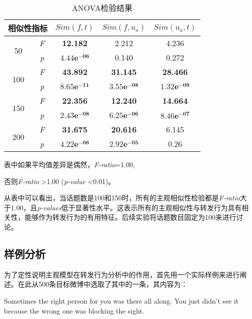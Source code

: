 \begin{table}[htb]
\scriptsize
\centering
\caption{ANOVA检验结果} 
\label{tab6-3}
\begin{tabular}{|c|c|c|c|c|}
\hline
\multicolumn{2}{|c|}{相似性指标}& $ Sim(f,t) $ & $ Sim(f,u_a)  $ & $ Sim(u_a,t)  $\\
\hline
\multirow{2}{*}{50} & \textit{F} & \textbf{12.182} & 2.212 & 4.236 \\
\cline{2-5}
  & \textit{p} &  $\mathbf{4.44e^{-06}}$  & 0.140 & 0.272\\
\hline
\multirow{2}{*}{100} & \textit{F} & \textbf{43.892} & \textbf{31.145} & \textbf{28.466} \\
\cline{2-5}
  & \textit{p} &  $\mathbf{8.65e^{-11}}$  & $\mathbf{3.55e^{-08}}$ & $\mathbf{1.32e^{-09}}$\\
\hline
\multirow{2}{*}{150} & \textit{F} & \textbf{22.356} & \textbf{12.240} & \textbf{14.664} \\
\cline{2-5}
  & \textit{p} &  $\mathbf{2.43e^{-08}}$  & $\mathbf{6.25e^{-06}}$ & $\mathbf{8.46e^{-07}}$\\
\hline
\multirow{2}{*}{200} & \textit{F} & \textbf{31.675} & \textbf{20.616} & 6.145\\
\cline{2-5}
  & \textit{p} &  $\mathbf{4.22e^{-06}}$  & $\mathbf{2.92e^{-05}}$ & 0.26\\
\hline
\end{tabular}
\begin{tablenotes}
  \centering
  \footnotesize
\item 表中如果平均值差异是偶然，\textit{F-ratio}=1.00,\\
\item 否则\textit{F-ratio} \textgreater 1.00 (\textit{p-value} \textless 0.01)。\\
\end{tablenotes}
\end{table}

从表中可以看出，当话题数是100和150时，所有的主观相似性检验都是\textit{F-ratio}大于1.00，且\textit{p-values}低于显著性水平。这表示所有的主观相似性与转发行为具有相关性，能够作为转发行为的有用特征。后续实验将话题数目固定为100来进行讨论。

\subsection{样例分析}
\label{example}
为了定性说明主观模型在转发行为分析中的作用，首先用一个实际样例来进行阐述。在此从500条目标微博中选取了其中的一条，其内容为：
\begin{description}
\item Sometimes the right person for you was there all along. You just didn’t see it because the wrong one was blocking the sight.
\end{description}

